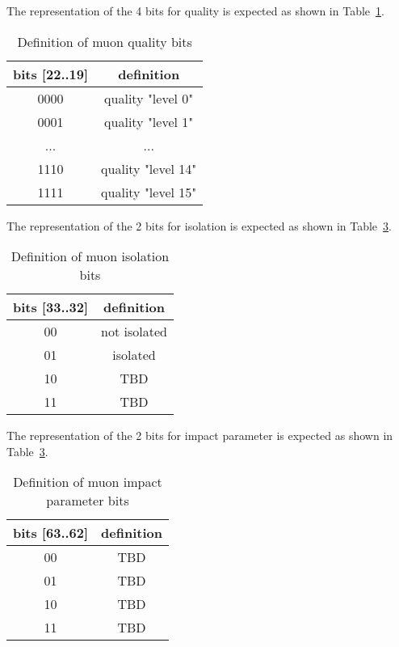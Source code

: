 The representation of the 4 bits for quality is expected as shown in Table~\ref{tab:gtl:muon_quality_bits}.\\

\begin{table}[ht]
\caption{Definition of muon quality bits}
\vspace{5mm}
\centering
\begin{tabular}{|c|c|}\hline
bits [22..19] & definition \\\hline\hline
0000 & quality "level 0" \\
0001 & quality "level 1" \\
... & ... \\
1110 & quality "level 14" \\
1111 & quality "level 15" \\\hline
\end{tabular}
\label{tab:gtl:muon_quality_bits}
\end{table}

The representation of the 2 bits for isolation is expected as shown in Table~\ref{tab:gtl:muon_iso_bits}.\\

\begin{table}[ht]
\caption{Definition of muon isolation bits}
\vspace{5mm}
\centering
\begin{tabular}{|c|c|}\hline
bits [33..32] & definition \\\hline\hline
00 & not isolated \\
01 & isolated \\
10 & TBD \\
11 & TBD \\\hline
\end{tabular}
\label{tab:gtl:muon_iso_bits}
\end{table}

The representation of the 2 bits for impact parameter is expected as shown in Table~\ref{tab:gtl:muon_iso_bits}.\\

\begin{table}[ht]
\caption{Definition of muon impact parameter bits}
\vspace{5mm}
\centering
\begin{tabular}{|c|c|}\hline
bits [63..62] & definition \\\hline\hline
00 & TBD \\
01 & TBD \\
10 & TBD \\
11 & TBD \\\hline
\end{tabular}
\label{tab:gtl:muon_iso_bits}
\end{table}

